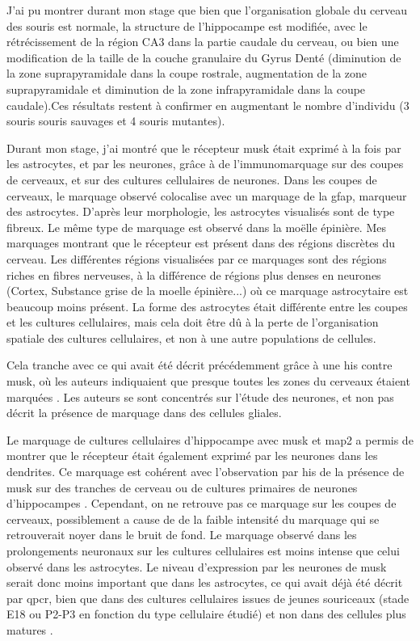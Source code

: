 J'ai pu montrer durant mon stage que bien que l'organisation globale du cerveau des souris \mcrd est normale, la structure de l'hippocampe est modifiée, avec le rétrécissement de la région CA3 dans la partie caudale du cerveau, ou bien une modification de la taille de la couche granulaire du Gyrus Denté (diminution de la zone suprapyramidale dans la coupe rostrale, augmentation de la zone suprapyramidale et diminution de la zone infrapyramidale dans la coupe caudale).Ces résultats restent à confirmer en augmentant le nombre d'individu (3 souris souris sauvages et 4 souris mutantes).

Durant mon stage, j'ai montré que le récepteur \gls{musk} était exprimé à la fois par les astrocytes, et par les neurones, grâce à de l'immunomarquage sur des coupes de cerveaux, et sur des cultures cellulaires de neurones. Dans les coupes de cerveaux, le marquage observé colocalise avec un marquage de la \gls{gfap}, marqueur des astrocytes. D'après leur morphologie, les astrocytes visualisés sont de type fibreux. Le même type de marquage est observé dans la moëlle épinière. Mes marquages montrant que le récepteur est présent dans des régions discrètes du cerveau. Les différentes régions visualisées par ce marquages sont des régions riches en fibres nerveuses, à la différence de régions plus denses en neurones (Cortex, Substance grise de la moelle épinière...) où ce marquage astrocytaire est beaucoup moins présent. La forme des astrocytes était différente entre les coupes et les cultures cellulaires, mais cela doit être dû à la perte de l'organisation spatiale des cultures cellulaires, et non à une autre populations de cellules.

Cela tranche avec ce qui avait été décrit précédemment grâce à une \acrlong{his} contre \gls{musk}, où les auteurs indiquaient que presque toutes les zones du cerveaux étaient marquées \cite{Garcia-Osta2006}. Les auteurs se sont concentrés sur l'étude des neurones, et non pas décrit la présence de marquage dans des cellules gliales.

Le marquage de cultures cellulaires d'hippocampe avec \gls{musk} et \gls{map2} a permis de montrer que le récepteur était également exprimé par les neurones dans les dendrites. Ce marquage est cohérent avec l'observation par \acrlong{his} de la présence de \gls{musk} sur des tranches de cerveau ou de cultures primaires de neurones d'hippocampes \cite{Garcia-Osta2006}. Cependant, on ne retrouve pas ce marquage sur les coupes de cerveaux, possiblement a cause de de la faible intensité du marquage qui se retrouverait noyer dans le bruit de fond. Le marquage observé dans les prolongements neuronaux sur les cultures cellulaires est moins intense que celui observé dans les astrocytes. Le niveau d'expression par les neurones de \gls{musk} serait donc moins important que dans les astrocytes, ce qui avait déjà été décrit par \gls{qpcr}, bien que dans des cultures cellulaires issues de jeunes souriceaux (stade E18 ou P2-P3 en fonction du type cellulaire étudié) et non dans des cellules plus matures \cite{Sun2016}. 

